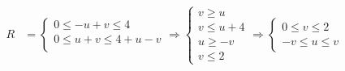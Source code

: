 \begin{align*}
  R &= \begin{cases}
            0 \leq -u + v \leq 4 \\
            0 \leq u + v \leq 4 + u - v \\
       \end{cases}
    \Rightarrow \begin{cases}
        v \geq u \\
        v \leq u + 4 \\
        u \geq -v \\
        v \leq 2
    \end{cases} 
    \Rightarrow \begin{cases}
        0 \leq v \leq 2 \\
        -v \leq u \leq v
    \end{cases}  
\end{align*}